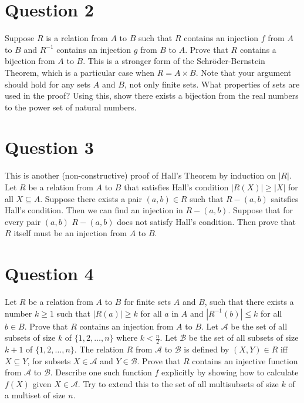 \documentclass[12pt]{report}
\begin{document}
\section*{Question 2}
Suppose $R$ is a relation from $A$ to $B$ such that $R$ contains an injection $f$ from $A$ to $B$ and $R^{-1}$ contains an injection $g$ from $B$ to $A$. Prove that $R$ contains a bijection from $A$ to $B$. This is a stronger form of the Schröder-Bernstein Theorem, which is a particular case when $R = A \times B$. Note that your argument should hold for any sets $A$ and $B$, not only finite sets. What properties of sets are used in the proof? Using this, show there exists a bijection from the real numbers to the power set of natural numbers.
\section*{Question 3}
This is another (non-constructive) proof of Hall's Theorem by induction on $|R|$. Let $R$ be a relation from $A$ to $B$ that satisfies Hall's condition $|R(X)| \geq |X|$ for all $X \subseteq A$. Suppose there exists a pair $(a, b) \in R$ such that $R - (a, b)$ saitsfies Hall's condition. Then we can find an injection in $R - (a, b)$. Suppose that for every pair $(a, b)$ $R - (a, b)$ does not satisfy Hall's condition. Then prove that $R$ itself must be an injection from $A$ to $B$.
\section*{Question 4}
Let $R$ be a relation from $A$ to $B$ for finite sets $A$ and $B$, such that there exists a number $k \geq 1$ such that $|R(a)| \geq k$ for all $a$ in $A$ and $|R^{-1}(b)| \leq k$ for all $b \in B$. Prove that $R$ contains an injection from $A$ to $B$. Let $\mathcal{A}$ be the set of all subsets of size $k$ of $\{1, 2, \dots, n\}$ where $k < \frac{n}{2}$. Let $\mathcal{B}$ be the set of all subsets of size $k + 1$ of $\{1, 2, \dots, n\}$. The relation $R$ from $\mathcal{A}$ to $\mathcal{B}$ is defined by $(X, Y) \in R$ iff $X \subseteq Y$, for subsets $X \in \mathcal{A}$ and $Y \in \mathcal{B}$. Prove that $R$ contains an injective function from $\mathcal{A}$ to $\mathcal{B}$. Describe one such function $f$ explicitly by showing how to calculate $f(X)$ given $X \in \mathcal{A}$. Try to extend this to the set of all multisubsets of size $k$ of a multiset of size $n$.
\end{document}

